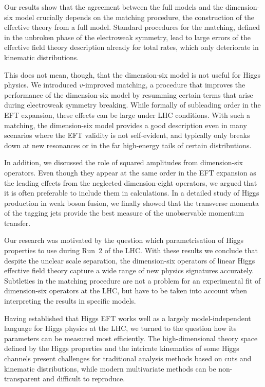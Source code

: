 Our results show that the agreement between the full models and the
dimension-six model crucially depends on the matching procedure, \ie
the construction of the effective theory from a full model. Standard
procedures for the matching, defined in the unbroken phase of the
electroweak symmetry, lead to large errors of the effective field
theory description already for total rates, which only deteriorate
in kinematic distributions.

This does not mean, though, that the dimension-six model is not useful
for Higgs physics. We introduced $v$-improved matching, a procedure
that improves the performance of the dimension-six model by resumming
certain terms that arise during electroweak symmetry breaking. While
formally of subleading order in the EFT expansion, these effects can
be large under LHC conditions. With such a matching, the dimension-six
model provides a good description even in many scenarios where the EFT
validity is not self-evident, and typically only breaks down at new
resonances or in the far high-energy tails of certain distributions.

In addition, we discussed the role of squared amplitudes from
dimension-six operators. Even though they appear at the same order in
the EFT expansion as the leading effects from the neglected
dimension-eight operators, we argued that it is often preferable to
include them in calculations. In a detailed study of Higgs production
in weak boson fusion, we finally showed that the transverse momenta of
the tagging jets provide the best measure of the unobservable momentum
transfer.

Our research was motivated by the question which parametrisation of
Higgs properties to use during Run~2 of the LHC. With these results we
conclude that despite the unclear scale separation, the dimension-six
operators of linear Higgs effective field theory capture a wide range
of new physics signatures accurately. Subtleties in the matching
procedure are not a problem for an experimental fit of dimension-six
operators at the LHC, but have to be taken into account when
interpreting the results in specific models.

\newparagraph
%
Having established that Higgs EFT works well as a largely
model-independent language for Higgs physics at the LHC, we turned to
the question how its parameters can be measured most efficiently. The
high-dimensional theory space defined by the Higgs properties and the
intricate kinematics of some Higgs channels present challenges for
traditional analysis methods based on cuts and kinematic
distributions, while modern multivariate methods can be
non-transparent and difficult to reproduce.


